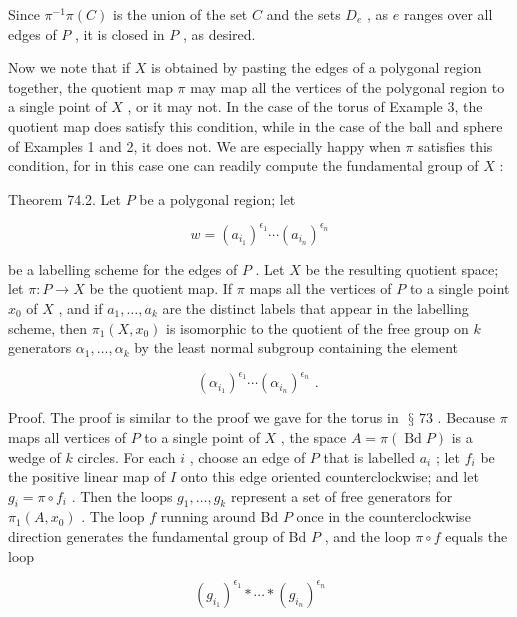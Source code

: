 \documentclass[10pt]{article}
\begin{document}
Since \({\pi }^{-1}\pi \left( C\right)\) is the union of the set \(C\) and the sets \({D}_{e}\) , as \(e\) ranges over all edges of \(P\) , it is closed in \(P\) , as desired.

Now we note that if \(X\) is obtained by pasting the edges of a polygonal region together, the quotient map \(\pi\) may map all the vertices of the polygonal region to a single point of \(X\) , or it may not. In the case of the torus of Example 3, the quotient map does satisfy this condition, while in the case of the ball and sphere of Examples 1 and 2, it does not. We are especially happy when \(\pi\) satisfies this condition, for in this case one can readily compute the fundamental group of \(X\) :

Theorem 74.2. Let \(P\) be a polygonal region; let

\[
w = {\left( {a}_{{i}_{1}}\right) }^{{\epsilon }_{1}}\cdots {\left( {a}_{{i}_{n}}\right) }^{{\epsilon }_{n}}
\]

be a labelling scheme for the edges of \(P\) . Let \(X\) be the resulting quotient space; let \(\pi  : P \rightarrow  X\) be the quotient map. If \(\pi\) maps all the vertices of \(P\) to a single point \({x}_{0}\) of \(X\) , and if \({a}_{1},\ldots ,{a}_{k}\) are the distinct labels that appear in the labelling scheme, then \({\pi }_{1}\left( {X,{x}_{0}}\right)\) is isomorphic to the quotient of the free group on \(k\) generators \({\alpha }_{1},\ldots ,{\alpha }_{k}\) by the least normal subgroup containing the element

\[
{\left( {\alpha }_{{i}_{1}}\right) }^{{\epsilon }_{1}}\cdots {\left( {\alpha }_{{i}_{n}}\right) }^{{\epsilon }_{n}}\text{ . }
\]

Proof. The proof is similar to the proof we gave for the torus in \(\text{ § }{73}\) . Because \(\pi\) maps all vertices of \(P\) to a single point of \(X\) , the space \(A = \pi \left( {\operatorname{Bd}P}\right)\) is a wedge of \(k\) circles. For each \(i\) , choose an edge of \(P\) that is labelled \({a}_{i}\) ; let \({f}_{i}\) be the positive linear map of \(I\) onto this edge oriented counterclockwise; and let \({g}_{i} = \pi  \circ  {f}_{i}\) . Then the loops \({g}_{1},\ldots ,{g}_{k}\) represent a set of free generators for \({\pi }_{1}\left( {A,{x}_{0}}\right)\) . The loop \(f\) running around Bd \(P\) once in the counterclockwise direction generates the fundamental group of Bd \(P\) , and the loop \(\pi  \circ  f\) equals the loop

\[
{\left( {g}_{{i}_{1}}\right) }^{{\epsilon }_{1}} * \cdots  * {\left( {g}_{{i}_{n}}\right) }^{{\epsilon }_{n}}
\]
\end{document}
